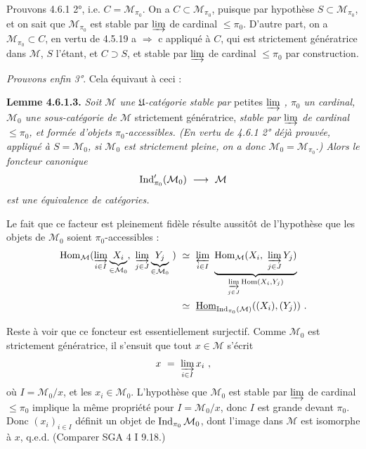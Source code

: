 Prouvons 4.6.1 2°, i.e. $C=\mathcal{M}_{\pi_0}$. On a $C\subset\mathcal{M}_{\pi_0}$, puisque par hypothèse $S\subset\mathcal{M}_{\pi_0}$, et on sait que $\mathcal{M}_{\pi_0}$ est stable par $\varinjlim$ de cardinal $\leqslant\pi_0$. D'autre part, on a $\mathcal{M}_{\pi_0}\subset C$, en vertu de 4.5.19 a $\Longrightarrow$ c appliqué à $C$, qui est strictement génératrice dans $\mathcal{M}$, $S$ l'étant, et $C\supset S$, et stable par $\varinjlim$ de cardinal $\leqslant\pi_0$ par construction.

\textit{Prouvons enfin 3°}. Cela équivaut à ceci :

\textbf{Lemme 4.6.1.3.} \textit{Soit $\mathcal{M}$ une $\mathfrak{U}$-catégorie stable par} petites \textit{$\varinjlim$ , $\pi_0$ un cardinal, $\mathcal{M}_0$ une sous-catégorie de $\mathcal{M}$} strictement génératrice, \textit{stable par $\varinjlim$ de cardinal $\leqslant\pi_0$, et formée d'objets $\pi_0$-accessibles. (En vertu de 4.6.1 2° déjà prouvée, appliqué à $S=\mathcal{M}_0$, si $\mathcal{M}_0$ est strictement pleine, on a donc $\mathcal{M}_0=\mathcal{M}_{\pi_0}$.) Alors le foncteur canonique}
\[
\Ind'_{\pi_0}(\mathcal{M}_0) \ \longrightarrow\ \mathcal{M}
\]
\textit{est une équivalence de catégories.}

Le fait que ce facteur est pleinement fidèle résulte aussitôt de l'hypothèse que les objets de $\mathcal{M}_0$ soient $\pi_0$-accessibles : %
\[
\begin{aligned}
\operatorname{Hom}_{\mathcal{M}}(\varinjlim_{i\in I}\underbrace{X_i}_{\in\mathcal{M}_0},\ \varinjlim_{j\in J}\underbrace{Y_j}_{\in\mathcal{M}_0}\ ) &\ \simeq\ \varprojlim_{i\in I}\ \underbrace{\operatorname{Hom}_{\mathcal{M}}(X_i,\ \varinjlim_{j\in J}Y_j)}_{\varinjlim\limits_{j\in J}\operatorname{Hom}(X_i,Y_j)}\\
&\ \simeq\ \underline{\operatorname{Hom}}_{\Ind_{\pi_0}(\mathcal{M})}((X_i),(Y_j))\ .
\end{aligned}
\]


Reste à voir que ce foncteur est essentiellement surjectif. Comme $\mathcal{M}_0$ est strictement génératrice, il s'ensuit que tout $x\in\mathcal{M}$ s'écrit
\[
x \ =\ \varinjlim_{i\in I}x_i\ ,
\]
où $I=\mathcal{M}_0/x$, et les $x_i\in\mathcal{M}_0$. L'hypothèse que $\mathcal{M}_0$ est stable par $\varinjlim$ de cardinal $\leqslant\pi_0$ implique la même propriété pour $I=\mathcal{M}_0/x$, donc $I$ est grande devant $\pi_0$. Donc $(x_i)_{i\in I}$ définit un objet de $\operatorname{Ind}_{\pi_0}\mathcal{M}_0$, dont l'image dans $\mathcal{M}$ est isomorphe à $x$, q.e.d. (Comparer SGA 4 I 9.18.)

